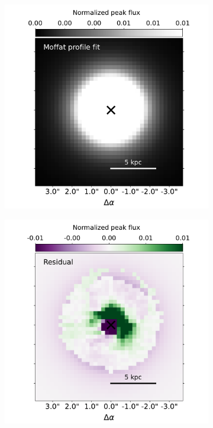 \begin{figure}[!t]
\begin{subfigure}[t]{0.3355\linewidth}
    \end{subfigure}
    \hspace*{\fill}
    \begin{subfigure}[t]{0.3\linewidth}
        \centering
        \includegraphics[width=\textwidth, trim={2cm 0 1.5cm 0}, clip]{figures/muse_f13451_1232/nuclear_model_psf_model_highcrop.pdf}
    \end{subfigure}
    \hspace*{\fill}
    \begin{subfigure}[t]{0.3\linewidth}
        \centering
        \includegraphics[width=\textwidth, trim={2cm 0 1.5cm 0}, clip]{figures/muse_f13451_1232/nuclear_model_psf_residual_highcrop.pdf}

\end{subfigure}
\end{figure}
